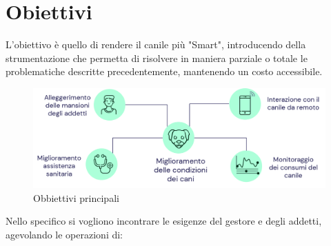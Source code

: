 \section{Obiettivi}
L'obiettivo è quello di rendere il canile più "Smart", introducendo della strumentazione che permetta di risolvere in maniera parziale o totale le problematiche descritte precedentemente, mantenendo un costo accessibile. 

    \begin{figure}[H]
        \caption{Obbiettivi principali}
        \label{fig:Obbiettivi}
        \centering
       \includegraphics[width=1\textwidth]{Images/cani.png}
    \end{figure}
Nello specifico si vogliono incontrare le esigenze del gestore e degli addetti, agevolando le operazioni di:
